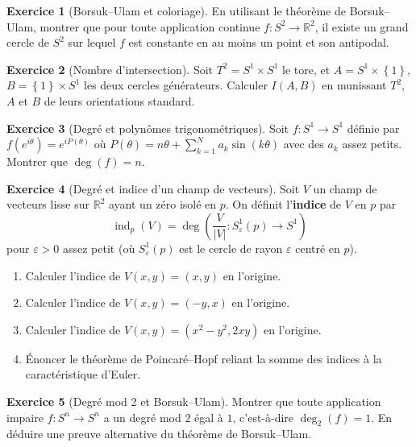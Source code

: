 \documentclass[12pt,a4paper,openany]{book}
\theoremstyle{definition}
\newtheorem{exercice}{Exercice}[chapter]
\theoremstyle{plain}
\theoremstyle{remark}
\newcommand{\R}{\mathbb{R}}
\newcommand{\abs}[1]{\left|#1\right|}
\newcommand{\set}[1]{\left\{#1\right\}}
\begin{document}
\begin{exercice}[Borsuk--Ulam et coloriage]\label{exo:degre-7}
En utilisant le théorème de Borsuk--Ulam, montrer que pour toute application
continue $f : S^2 \to \R^2$, il existe un grand cercle de $S^2$ sur lequel $f$
est constante en au moins un point et son antipodal.
\end{exercice}

\begin{exercice}[Nombre d'intersection]\label{exo:degre-8}
Soit $T^2 = S^1 \times S^1$ le tore, et $A = S^1 \times \set{1}$,
$B = \set{1} \times S^1$ les deux cercles générateurs. Calculer $I(A,B)$ en
munissant $T^2$, $A$ et $B$ de leurs orientations standard.
\end{exercice}

\begin{exercice}[Degré et polynômes trigonométriques]\label{exo:degre-9}
Soit $f : S^1 \to S^1$ définie par $f(e^{i\theta}) = e^{iP(\theta)}$ où
$P(\theta) = n\theta + \sum_{k=1}^{N} a_k \sin(k\theta)$ avec des $a_k$ assez
petits. Montrer que $\deg(f) = n$.
\end{exercice}

\begin{exercice}[Degré et indice d'un champ de vecteurs]\label{exo:degre-10}
Soit $V$ un champ de vecteurs lisse sur $\R^2$ ayant un zéro isolé en $p$.
On définit l'\textbf{indice} de $V$ en $p$ par
\[
  \operatorname{ind}_p(V) = \deg\!\left(\frac{V}{\abs{V}} : S^1_\varepsilon(p) \to S^1\right)
\]
pour $\varepsilon > 0$ assez petit (où $S^1_\varepsilon(p)$ est le cercle de rayon
$\varepsilon$ centré en $p$).
\begin{enumerate}[label=(\alph*)]
  \item Calculer l'indice de $V(x,y) = (x, y)$ en l'origine.
  \item Calculer l'indice de $V(x,y) = (-y, x)$ en l'origine.
  \item Calculer l'indice de $V(x,y) = (x^2 - y^2, 2xy)$ en l'origine.
  \item Énoncer le théorème de Poincaré--Hopf
    reliant la somme des indices à la caractéristique d'Euler.
\end{enumerate}
\end{exercice}

\begin{exercice}[Degré mod 2 et Borsuk--Ulam]\label{exo:degre-11}
Montrer que toute application impaire $f : S^n \to S^n$ a un degré mod $2$ égal
à $1$, c'est-à-dire $\deg_2(f) = 1$. En déduire une preuve alternative du
théorème de Borsuk--Ulam.
\end{exercice}
\end{document}
